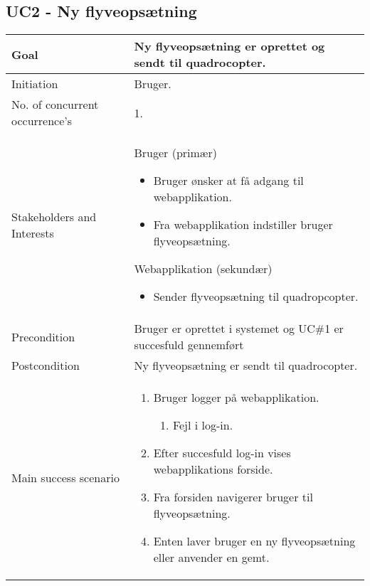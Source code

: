 \subsection*{UC2 - Ny flyveopsætning}

\begin{table}[H]
\begin{tabular}{|l|p{10cm}|}
\hline

Goal	 							& Ny flyveopsætning er oprettet og sendt til quadrocopter. \\\hline
Initiation 							& Bruger. \\\hline
No. of concurrent occurrence’s		& 1. \\\hline
Stakeholders	and Interests			& Bruger (primær) 
										\begin{itemize}
											\item Bruger ønsker at få adgang til webapplikation.
											\item Fra webapplikation indstiller bruger flyveopsætning.
										\end{itemize}
									  Webapplikation (sekundær)
										\begin{itemize}
											\item Sender flyveopsætning til quadropcopter.
										\end{itemize} \\\hline
Precondition							& Bruger er oprettet i systemet og UC\#1 er succesfuld gennemført  \\\hline
Postcondition						& Ny flyveopsætning er sendt til quadrocopter. \\\hline
Main success scenario				&
 
									\renewcommand{\labelenumi}{\arabic{enumi}.}
									\renewcommand{\labelenumii}{\Roman{enumii}:}

									\begin{enumerate}[topsep=0.0cm, leftmargin=0.5cm]
										\item Bruger logger på webapplikation.
										\begin{enumerate}[partopsep=4cm, topsep=0cm, leftmargin=1cm]
												\item Fejl i log-in.
										\end{enumerate}
										\item Efter succesfuld log-in vises webapplikations forside.
										\item Fra forsiden navigerer bruger til flyveopsætning.
										\item Enten laver bruger en ny flyveopsætning eller anvender en gemt.
									\end{enumerate} \\\hline	


\end{tabular}
\end{table}
